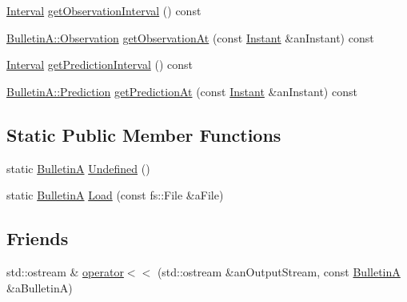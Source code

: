 \begin{DoxyCompactItemize}
\item 
\hyperlink{classostk_1_1physics_1_1time_1_1_interval}{Interval} \hyperlink{classostk_1_1physics_1_1coord_1_1frame_1_1provider_1_1iers_1_1_bulletin_a_ad744151dbc8ebe2cd28a781db664e6dd}{get\+Observation\+Interval} () const
\item 
\hyperlink{structostk_1_1physics_1_1coord_1_1frame_1_1provider_1_1iers_1_1_bulletin_a_1_1_observation}{Bulletin\+A\+::\+Observation} \hyperlink{classostk_1_1physics_1_1coord_1_1frame_1_1provider_1_1iers_1_1_bulletin_a_a0af97235c46ce0a64acae8d15f5de003}{get\+Observation\+At} (const \hyperlink{classostk_1_1physics_1_1time_1_1_instant}{Instant} \&an\+Instant) const
\item 
\hyperlink{classostk_1_1physics_1_1time_1_1_interval}{Interval} \hyperlink{classostk_1_1physics_1_1coord_1_1frame_1_1provider_1_1iers_1_1_bulletin_a_a88451e3579f02d661be8333bdc0d0fc6}{get\+Prediction\+Interval} () const
\item 
\hyperlink{structostk_1_1physics_1_1coord_1_1frame_1_1provider_1_1iers_1_1_bulletin_a_1_1_prediction}{Bulletin\+A\+::\+Prediction} \hyperlink{classostk_1_1physics_1_1coord_1_1frame_1_1provider_1_1iers_1_1_bulletin_a_a959aeb67393651da4af3a93556775ff6}{get\+Prediction\+At} (const \hyperlink{classostk_1_1physics_1_1time_1_1_instant}{Instant} \&an\+Instant) const
\end{DoxyCompactItemize}
\subsection*{Static Public Member Functions}
\begin{DoxyCompactItemize}
\item 
static \hyperlink{classostk_1_1physics_1_1coord_1_1frame_1_1provider_1_1iers_1_1_bulletin_a}{BulletinA} \hyperlink{classostk_1_1physics_1_1coord_1_1frame_1_1provider_1_1iers_1_1_bulletin_a_ac826d8e711db915a3f2602da3cd35239}{Undefined} ()
\item 
static \hyperlink{classostk_1_1physics_1_1coord_1_1frame_1_1provider_1_1iers_1_1_bulletin_a}{BulletinA} \hyperlink{classostk_1_1physics_1_1coord_1_1frame_1_1provider_1_1iers_1_1_bulletin_a_af8046902a9a9e61138567b13601381e9}{Load} (const fs\+::\+File \&a\+File)
\end{DoxyCompactItemize}
\subsection*{Friends}
\begin{DoxyCompactItemize}
\item 
std\+::ostream \& \hyperlink{classostk_1_1physics_1_1coord_1_1frame_1_1provider_1_1iers_1_1_bulletin_a_ad02d4bd47c889c76484ba4056cee01a4}{operator$<$$<$} (std\+::ostream \&an\+Output\+Stream, const \hyperlink{classostk_1_1physics_1_1coord_1_1frame_1_1provider_1_1iers_1_1_bulletin_a}{BulletinA} \&a\+BulletinA)
\end{DoxyCompactItemize}


